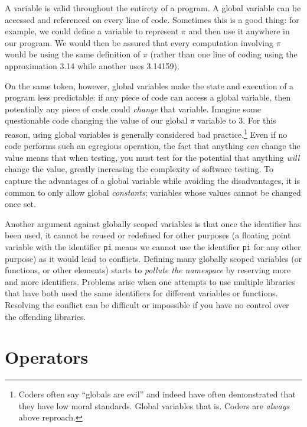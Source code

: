 A  variable is valid throughout the
entirety of a program.  A global variable can be accessed and referenced
on every line of code.  Sometimes this is a good thing: for example, we could
define a variable to represent $\pi$ and then use it anywhere in our program.
We would then be assured that every computation involving $\pi$ would be
using the same definition of $\pi$ (rather than one line of coding using the 
approximation 3.14 while another uses 3.14159).

On the same token, however, global variables make the state and 
execution of a program less predictable: if any piece of code can access a
global variable, then potentially any piece of code could \emph{change} that
variable.  Imagine some questionable code changing the value of our global
$\pi$ variable to 3.  For this reason, using global variables is generally 
considered bad practice.\footnote{Coders often say ``globals are evil'' and 
indeed have often demonstrated that they have low moral standards.  Global
variables that is.  Coders are \emph{always} above reproach.}  Even if no code performs
such an egregious operation, the fact that anything \emph{can} change the
value means that when testing, you must test for the potential that anything
\emph{will} change the value, greatly increasing the complexity of software
testing. To capture the advantages of a global variable while avoiding 
the disadvantages, it is common to only allow global 
\emph{constants}; variables whose values 
cannot be changed once set.

Another argument against globally scoped variables is that once the identifier
has been used, it cannot be reused or redefined for other purposes (a floating point
variable with the identifier \texttt{pi} means we cannot use the identifier
\texttt{pi} for any other purpose) as it would lead to conflicts.  
Defining many globally scoped variables (or functions, or other elements) starts
to  \emph{pollute the namespace} by reserving more and more identifiers.
Problems arise when one attempts to use multiple libraries that have both
used the same identifiers for different variables or functions.  Resolving the
conflict can be difficult or impossible if you have no control over the offending
libraries.  
 
\section{Operators}

